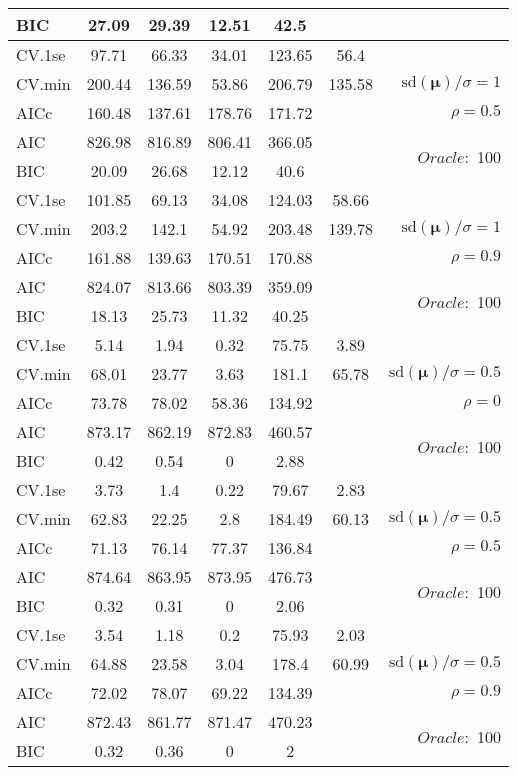 \begin{table}
\begin{center}
\begin{tabular}{l*{5}{c}|r}
BIC & 27.09 & 29.39 & 12.51 & 42.5 & &  \\
 \hline 
CV.1se & 97.71 & 66.33 & 34.01 & 123.65 & 56.4 & \\
CV.min & 200.44 & 136.59 & 53.86 & 206.79 & 135.58 &  $\mathrm{sd}(\mathbf{\mu})/\sigma=1$ \\
AICc & 160.48 & 137.61 & 178.76 & 171.72 & & $\rho=0.5$ \\
AIC & 826.98 & 816.89 & 806.41 & 366.05 & &  \multirow{2}{*}{$Oracle: $ 100} \\
BIC & 20.09 & 26.68 & 12.12 & 40.6 & &  \\
 \hline 
CV.1se & 101.85 & 69.13 & 34.08 & 124.03 & 58.66 & \\
CV.min & 203.2 & 142.1 & 54.92 & 203.48 & 139.78 &  $\mathrm{sd}(\mathbf{\mu})/\sigma=1$ \\
AICc & 161.88 & 139.63 & 170.51 & 170.88 & & $\rho=0.9$ \\
AIC & 824.07 & 813.66 & 803.39 & 359.09 & &  \multirow{2}{*}{$Oracle: $ 100} \\
BIC & 18.13 & 25.73 & 11.32 & 40.25 & &  \\
 \hline 
CV.1se & 5.14 & 1.94 & 0.32 & 75.75 & 3.89 & \\
CV.min & 68.01 & 23.77 & 3.63 & 181.1 & 65.78 &  $\mathrm{sd}(\mathbf{\mu})/\sigma=0.5$ \\
AICc & 73.78 & 78.02 & 58.36 & 134.92 & & $\rho=0$ \\
AIC & 873.17 & 862.19 & 872.83 & 460.57 & &  \multirow{2}{*}{$Oracle: $ 100} \\
BIC & 0.42 & 0.54 & 0 & 2.88 & &  \\
 \hline 
CV.1se & 3.73 & 1.4 & 0.22 & 79.67 & 2.83 & \\
CV.min & 62.83 & 22.25 & 2.8 & 184.49 & 60.13 &  $\mathrm{sd}(\mathbf{\mu})/\sigma=0.5$ \\
AICc & 71.13 & 76.14 & 77.37 & 136.84 & & $\rho=0.5$ \\
AIC & 874.64 & 863.95 & 873.95 & 476.73 & &  \multirow{2}{*}{$Oracle: $ 100} \\
BIC & 0.32 & 0.31 & 0 & 2.06 & &  \\
 \hline 
CV.1se & 3.54 & 1.18 & 0.2 & 75.93 & 2.03 & \\
CV.min & 64.88 & 23.58 & 3.04 & 178.4 & 60.99 &  $\mathrm{sd}(\mathbf{\mu})/\sigma=0.5$ \\
AICc & 72.02 & 78.07 & 69.22 & 134.39 & & $\rho=0.9$ \\
AIC & 872.43 & 861.77 & 871.47 & 470.23 & &  \multirow{2}{*}{$Oracle: $ 100} \\
BIC & 0.32 & 0.36 & 0 & 2 & &  \\
 \hline 
\end{tabular}
\end{center}
\vspace{-1cm}
\end{table}




